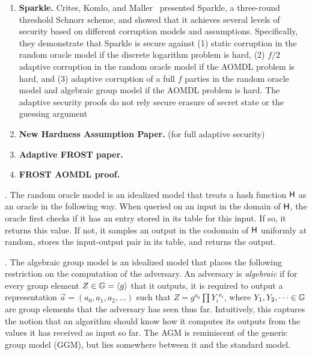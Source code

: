 \begin{enumerate}
\item \textbf{Sparkle.}  Crites, Komlo, and Maller~\cite{CritesKM23} presented Sparkle, a three-round threshold Schnorr scheme, and showed that it achieves several levels of security based on different corruption models and assumptions.  Specifically, they demonstrate that Sparkle is secure against (1) static corruption in the random oracle model if the discrete logarithm problem is hard, (2) $f/2$ adaptive corruption in the random oracle model if the AOMDL problem is hard, and (3) adaptive corruption of a full $f$ parties in the random oracle model and algebraic group model if the AOMDL problem is hard.  The adaptive security proofs do not rely secure erasure of secret state or the guessing argument 
\item \textbf{New Hardness Assumption Paper.} (for full adaptive security)
\item \textbf{Adaptive FROST paper.}
\item \textbf{FROST AOMDL proof.} 
\end{enumerate}

. The random oracle model is an idealized model that treats a hash function $\mathsf{H}$ as an oracle in the following way.  When queried on an input in the domain of $\mathsf{H}$, the oracle first checks if it has an entry stored in its table for this input.  If so, it returns this value.  If not, it samples an output in the codomain of $\mathsf{H}$ uniformly at random, stores the input-output pair in its table, and returns the output.

. The algebraic group model is an idealized model that places the following restriction on the computation of the adversary. An adversary is \emph{algebraic} if for every group element $Z \in \mathbb{G} = \langle g \rangle$ that it outputs, it is required to output a representation $\vec{a} = (a_0, a_1, a_2, \dots)$ such that $Z = g^{a_0} \prod {Y_i}^{a_i}$, where $Y_1, Y_2, \dots \in \mathbb{G}$ are group elements that the adversary has seen thus far.
Intuitively, this captures the notion that an algorithm should know how it computes its outputs from the values it has received as input so far.
The AGM is reminiscent of the generic group model (GGM), but lies somewhere between it and the standard model.

